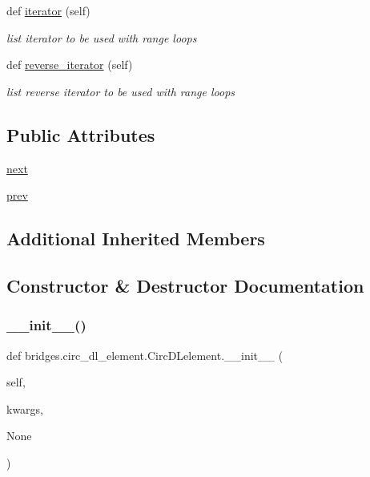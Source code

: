 \begin{DoxyCompactItemize}
def \hyperlink{classbridges_1_1circ__dl__element_1_1_circ_d_lelement_a3a796e463ea4ed382770bbe8107fd2d8}{iterator} (self)
\begin{DoxyCompactList}\small\item\em list iterator to be used with range loops \end{DoxyCompactList}\item 
def \hyperlink{classbridges_1_1circ__dl__element_1_1_circ_d_lelement_ae92b2635ac5d448f4ad90d058fb5e4ab}{reverse\+\_\+iterator} (self)
\begin{DoxyCompactList}\small\item\em list reverse iterator to be used with range loops \end{DoxyCompactList}\end{DoxyCompactItemize}
\subsection*{Public Attributes}
\begin{DoxyCompactItemize}
\item 
\hyperlink{classbridges_1_1circ__dl__element_1_1_circ_d_lelement_a0f01f7ff433628bac241d7c069a476fa}{next}
\item 
\hyperlink{classbridges_1_1circ__dl__element_1_1_circ_d_lelement_a78ed845303a07e303bcbb39f015843d0}{prev}
\end{DoxyCompactItemize}
\subsection*{Additional Inherited Members}


\subsection{Constructor \& Destructor Documentation}
\mbox{\label{classbridges_1_1circ__dl__element_1_1_circ_d_lelement_a9536764f84d69deb9f7e03d6802a71b6}} 
\subsubsection{\texorpdfstring{\+\_\+\+\_\+init\+\_\+\+\_\+()}{\_\_init\_\_()}}
{\footnotesize\ttfamily def bridges.\+circ\+\_\+dl\+\_\+element.\+Circ\+D\+Lelement.\+\_\+\+\_\+init\+\_\+\+\_\+ (\begin{DoxyParamCaption}\item[{}]{self,  }\item[{}]{kwargs,  }\item[{}]{None }\end{DoxyParamCaption})}



